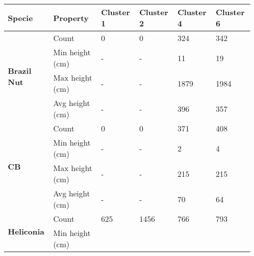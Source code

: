 \begin{table}[]
  \centering
	    \begin{tabular}{|p{2cm}|p{2cm}|p{2cm}|p{2cm}|p{2cm}|p{2cm}|}
		\hline	
		\textbf{Specie} & \textbf{Property} & \textbf{Cluster 1} & \textbf{Cluster 2} & \textbf{Cluster 4} & \textbf{Cluster 6} \\
		\hline
		\multirow{4}{*}{\textbf{Brazil Nut}} & 
						\multicolumn{1}{l|}{Count} & 
						\multicolumn{1}{l|}{0} & 
						\multicolumn{1}{l|}{0} &
						\multicolumn{1}{l|}{324} & 
						\multicolumn{1}{l|}{342} \\\cline{2-6} &
						\multicolumn{1}{l|}{Min height (cm)} & 
						\multicolumn{1}{l|}{-} & 
						\multicolumn{1}{l|}{-} &
						\multicolumn{1}{l|}{11} & 
						\multicolumn{1}{l|}{19} \\\cline{2-6} &
						\multicolumn{1}{l|}{Max height (cm)} & 
						\multicolumn{1}{l|}{-} & 
						\multicolumn{1}{l|}{-} &
						\multicolumn{1}{l|}{1879} & 
						\multicolumn{1}{l|}{1984} \\\cline{2-6} &
						\multicolumn{1}{l|}{Avg height (cm)} & 
						\multicolumn{1}{l|}{-} & 
						\multicolumn{1}{l|}{-} &
						\multicolumn{1}{l|}{396} & 
						\multicolumn{1}{l|}{357} \\\cline{2-6}
		\hline       
		\multirow{4}{*}{\textbf{CB}} & 
						\multicolumn{1}{l|}{Count} & 
						\multicolumn{1}{l|}{0} & 
						\multicolumn{1}{l|}{0} &
						\multicolumn{1}{l|}{371} & 
						\multicolumn{1}{l|}{408} \\\cline{2-6} &
						\multicolumn{1}{l|}{Min height (cm)} & 
						\multicolumn{1}{l|}{-} & 
						\multicolumn{1}{l|}{-} &
						\multicolumn{1}{l|}{2} & 
						\multicolumn{1}{l|}{4} \\\cline{2-6} &
						\multicolumn{1}{l|}{Max height (cm)} & 
						\multicolumn{1}{l|}{-} & 
						\multicolumn{1}{l|}{-} &
						\multicolumn{1}{l|}{215} & 
						\multicolumn{1}{l|}{215} \\\cline{2-6} &
						\multicolumn{1}{l|}{Avg height (cm)} & 
						\multicolumn{1}{l|}{-} & 
						\multicolumn{1}{l|}{-} &
						\multicolumn{1}{l|}{70} & 
						\multicolumn{1}{l|}{64} \\\cline{2-6}
		\hline      
		\multirow{4}{*}{\textbf{Heliconia}} & 
						\multicolumn{1}{l|}{Count} & 
						\multicolumn{1}{l|}{625} & 
						\multicolumn{1}{l|}{1456} &
						\multicolumn{1}{l|}{766} & 
						\multicolumn{1}{l|}{793} \\\cline{2-6} &
						\multicolumn{1}{l|}{Min height (cm)} & 

\end{tabular}
\end{table}
